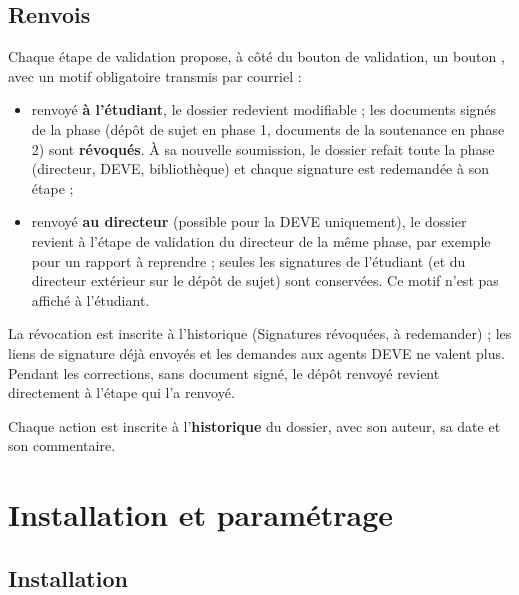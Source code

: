 \documentclass[11pt,a4paper]{article}
\begin{document}
\subsection{Renvois}

Chaque étape de validation propose, à côté du bouton de validation, un bouton
, avec un motif obligatoire transmis par courriel :

\begin{itemize}
  \item renvoyé \textbf{à l'étudiant}, le dossier redevient modifiable ; les
        documents signés de la phase (dépôt de sujet en phase 1, documents de la
        soutenance en phase 2) sont \textbf{révoqués}. À sa nouvelle soumission,
        le dossier refait toute la phase (directeur, DEVE, bibliothèque) et
        chaque signature est redemandée à son étape ;
  \item renvoyé \textbf{au directeur} (possible pour la DEVE uniquement), le
        dossier revient à l'étape de validation du directeur de la même phase,
        par exemple pour un rapport à reprendre ; seules les signatures de
        l'étudiant (et du directeur extérieur sur le dépôt de sujet) sont
        conservées. Ce motif n'est pas affiché à l'étudiant.
\end{itemize}

La révocation est inscrite à l'historique (\og Signatures révoquées, à
redemander\fg{}) ; les liens de signature déjà envoyés et les demandes aux
agents DEVE ne valent plus. Pendant les corrections, sans document signé, le
dépôt renvoyé revient directement à l'étape qui l'a renvoyé.



Chaque action est inscrite à l'\textbf{historique} du dossier, avec son auteur,
sa date et son commentaire.

\section{Installation et paramétrage}

\subsection{Installation}
\end{document}
